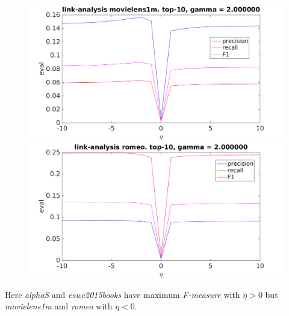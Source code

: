 \begin{figure}[h!]
\centering
\begin{minipage}{.5\textwidth}
    \centering
    \includegraphics[width=\linewidth]{fig/link_eta/movielens_link_eta.png}
\end{minipage}%
\begin{minipage}{.5\textwidth}
    \centering
    \includegraphics[width=\linewidth]{fig/link_eta/romeo_link_eta.png}
\end{minipage}
\end{figure}

\FloatBarrier

Here \textit{alphaS} and \textit{eswc2015books} have maximum \textit{F-measure} with $\eta > 0$ but \textit{movielens1m} and \textit{romeo} with $\eta < 0$.


